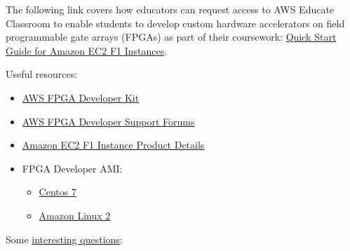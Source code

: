 \documentclass[a4paper]{article}
\begin{document}
    \noindent
    The following link covers how educators can request access to AWS Educate Classroom to enable students to develop custom hardware accelerators on field programmable gate arrays (FPGAs) as part of their coursework: \href{https://github.com/aws-samples/aws-fpga-classroom-setup/blob/main/README.md}{Quick Start Guide for Amazon EC2 F1 Instances}.\newline

    \noindent
    Useful resources:
    \begin{itemize}
        \item \href{https://github.com/aws/aws-fpga/}{AWS FPGA Developer Kit}
        \item \href{https://forums.aws.amazon.com/forum.jspa?forumID=243&start=0}{AWS FPGA Developer Support Forums}
        \item \href{https://aws.amazon.com/ec2/instance-types/f1/}{Amazon EC2 F1 Instance Product Details}
        \item FPGA Developer AMI:
        \begin{itemize}
            \item \href{https://aws.amazon.com/marketplace/pp/B06VVYBLZZ}{Centos 7}
            \item \href{https://aws.amazon.com/marketplace/pp/B08NTMMZ7X}{Amazon Linux 2}
        \end{itemize}
    \end{itemize}
    Some \href{https://github.com/aws-samples/aws-fpga-classroom-setup/blob/main/FAQ.md}{interesting questions}:
\end{document}
